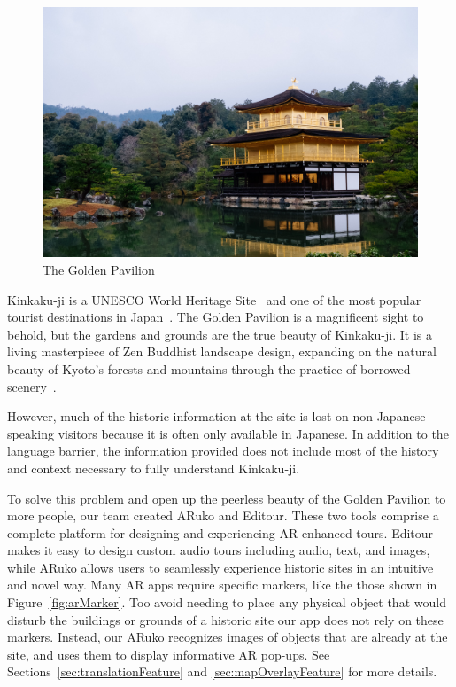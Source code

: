 \documentclass[a4paper, 10pt, american, titlepage]{article}
\begin{document}
\begin{figure}[h]
	\centering
	\includegraphics[width=\textwidth]{kinkakuji-1.jpg}
	\caption[The Golden Pavilion]{The Golden Pavilion~\autocite{fan2018}}
	\label{fig:kinkakuji1}
\end{figure}

Kinkaku-ji is a UNESCO World Heritage Site~\autocite{unesco} and one of the
most popular tourist destinations in Japan~\autocite{japanguide2019}. The
Golden Pavilion is a magnificent sight to behold, but the gardens and grounds
are the true beauty of Kinkaku-ji. It is a living masterpiece of Zen Buddhist
landscape design, expanding on the natural beauty of Kyoto's forests and
mountains through the practice of borrowed scenery~\autocite{kuitert2002}.

However, much of the historic information at the site is lost on non-Japanese
speaking visitors because it is often only available in Japanese. In addition to
the language barrier, the information provided does not include most of the
history and context necessary to fully understand Kinkaku-ji.

To solve this problem and open up the peerless beauty of the Golden Pavilion to
more people, our team created ARuko and Editour. These two tools comprise a
complete platform for designing and experiencing AR-enhanced tours. Editour
makes it easy to design custom audio tours including audio, text, and images,
while ARuko allows users to seamlessly experience historic sites in an intuitive
and novel way. Many AR apps require specific markers, like the those shown in
Figure~\ref{fig:arMarker}. Too avoid needing to place any physical object that
would disturb the buildings or grounds of a historic site our app does not rely
on these markers. Instead, our ARuko recognizes images of objects that are
already at the site, and uses them to display informative AR pop-ups. See
Sections~\ref{sec:translationFeature} and \ref{sec:mapOverlayFeature} for
more details.
\end{document}
